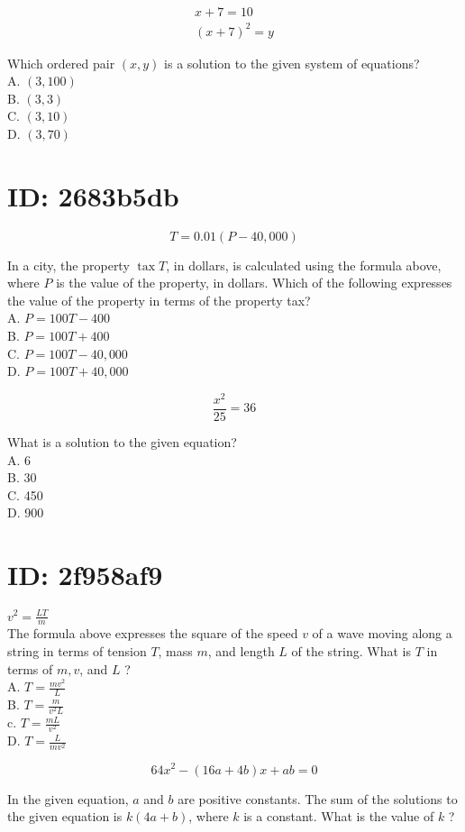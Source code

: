 $$
\begin{gathered}
x+7=10 \\
(x+7)^{2}=y
\end{gathered}
$$

Which ordered pair $(x, y)$ is a solution to the given system of equations?\\
A. $(3,100)$\\
B. $(3,3)$\\
C. $(3,10)$\\
D. $(3,70)$

\section*{ID: 2683b5db}
$$
T=0.01(P-40,000)
$$

In a city, the property $\operatorname{tax} T$, in dollars, is calculated using the formula above, where $P$ is the value of the property, in dollars. Which of the following expresses the value of the property in terms of the property tax?\\
A. $P=100 T-400$\\
B. $P=100 T+400$\\
C. $P=100 T-40,000$\\
D. $P=100 T+40,000$

$$
\frac{x^{2}}{25}=36
$$

What is a solution to the given equation?\\
A. 6\\
B. 30\\
C. 450\\
D. 900

\section*{ID: 2f958af9}
$v^{2}=\frac{L T}{m}$\\
The formula above expresses the square of the speed $v$ of a wave moving along a string in terms of tension $T$, mass $m$, and length $L$ of the string. What is $T$ in terms of $m, v$, and $L$ ?\\
A. $T=\frac{m v^{2}}{L}$\\
B. $T=\frac{m}{v^{2} L}$\\
c. $T=\frac{m L}{v^{2}}$\\
D. $T=\frac{L}{m v^{2}}$

$$
64 x^{2}-(16 a+4 b) x+a b=0
$$

In the given equation, $a$ and $b$ are positive constants. The sum of the solutions to the given equation is $k(4 a+b)$, where $k$ is a constant. What is the value of $k$ ?

